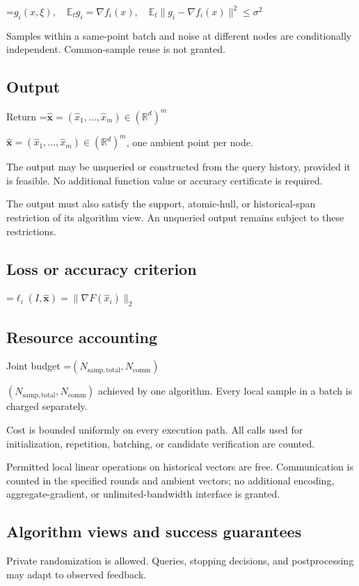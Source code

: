 \documentclass[10pt,a4paper]{article}
\newcommand{\AtlasMath}[1]{\par\begingroup\centering\setbox0=\hbox{$\displaystyle #1$}\ifdim\wd0>1.4\linewidth\typeout{ATLAS WIDE FORMULA: \the\wd0}\fi\ifdim\wd0>\linewidth\resizebox{\linewidth}{!}{\box0}\else\box0\fi\par\endgroup}
\newcommand{\AtlasInlineMath}[1]{\begingroup\setbox0=\hbox{$#1$}\ifdim\wd0>.4\linewidth\endgroup\AtlasMath{#1}\else\endgroup$#1$\fi}
\begin{document}
\AtlasMath{g_i(x,\xi),\quad\mathbb{E}_tg_i=\nabla f_i(x),\quad\mathbb{E}_t\|g_i-\nabla f_i(x)\|^2\le\sigma^2}


Samples within a same-point batch and noise at different nodes are conditionally independent. Common-sample reuse is not granted.

\subsection{Output}
Return \AtlasInlineMath{\widehat{\boldsymbol x}=(\widehat x_1,\ldots,\widehat x_m)\in(\mathbb R^d)^m}, one ambient point per node.

The output may be unqueried or constructed from the query history, provided it is feasible. No additional function value or accuracy certificate is required.

The output must also satisfy the support, atomic-hull, or historical-span restriction of its algorithm view. An unqueried output remains subject to these restrictions.

\subsection{Loss or accuracy criterion}

\AtlasMath{\ell_i(I,\widehat{\boldsymbol x})=\|\nabla F(\widehat{x}_i)\|_2}


\subsection{Resource accounting}
Joint budget \AtlasInlineMath{(N_{\mathrm{samp,total}},N_{\mathrm{comm}})} achieved by one algorithm. Every local sample in a batch is charged separately.

Cost is bounded uniformly on every execution path. All calls used for initialization, repetition, batching, or candidate verification are counted.

Permitted local linear operations on historical vectors are free. Communication is counted in the specified rounds and ambient vectors; no additional encoding, aggregate-gradient, or unlimited-bandwidth interface is granted.

\subsection{Algorithm views and success guarantees}
Private randomization is allowed. Queries, stopping decisions, and postprocessing may adapt to observed feedback.
\end{document}
